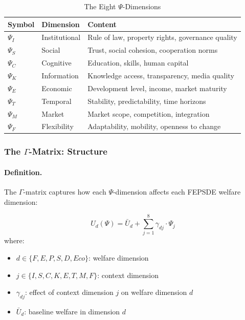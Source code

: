 \begin{table}[htbp]
\centering
\caption{The Eight $\Psi$-Dimensions}
\label{tab:psi-dimensions-recap}
\renewcommand{\arraystretch}{1.3}
\begin{tabular}{@{}lll@{}}
\toprule
\textbf{Symbol} & \textbf{Dimension} & \textbf{Content} \\
\midrule
$\Psi_I$ & Institutional & Rule of law, property rights, governance quality \\
$\Psi_S$ & Social & Trust, social cohesion, cooperation norms \\
$\Psi_C$ & Cognitive & Education, skills, human capital \\
$\Psi_K$ & Information & Knowledge access, transparency, media quality \\
$\Psi_E$ & Economic & Development level, income, market maturity \\
$\Psi_T$ & Temporal & Stability, predictability, time horizons \\
$\Psi_M$ & Market & Market scope, competition, integration \\
$\Psi_F$ & Flexibility & Adaptability, mobility, openness to change \\
\bottomrule
\end{tabular}
\end{table}

\subsubsection{The $\Gamma$-Matrix: Structure}

\paragraph{Definition.}
The $\Gamma$-matrix captures how each $\Psi$-dimension affects each FEPSDE 
welfare dimension:

\begin{definition}
\label{def:gamma-matrix}
\begin{equation}
U_d(\Psi) = \bar{U}_d + \sum_{j=1}^{8} \gamma_{dj} \cdot \Psi_j
\end{equation}
where:
\begin{itemize}
\item $d \in \{F, E, P, S, D, Eco\}$: welfare dimension
\item $j \in \{I, S, C, K, E, T, M, F\}$: context dimension
\item $\gamma_{dj}$: effect of context dimension $j$ on welfare dimension $d$
\item $\bar{U}_d$: baseline welfare in dimension $d$
\end{itemize}
\end{definition}


